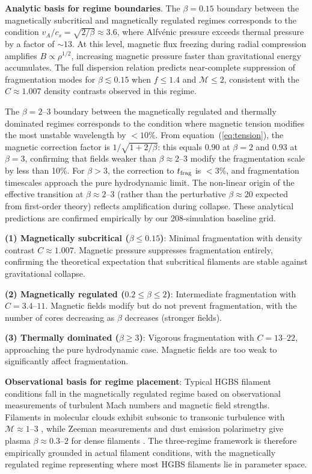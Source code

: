 \documentclass[twoside,twocolumn]{mnras}
\begin{document}
\textbf{Analytic basis for regime boundaries}. The $\beta = 0.15$ boundary between the magnetically subcritical and magnetically regulated regimes corresponds to the condition $v_A/c_s = \sqrt{2/\beta} \approx 3.6$, where Alfv\'enic pressure exceeds thermal pressure by a factor of $\sim 13$. At this level, magnetic flux freezing during radial compression amplifies $B \propto \rho^{1/2}$, increasing magnetic pressure faster than gravitational energy accumulates. The full dispersion relation \citep{Nakamura1993} predicts near-complete suppression of fragmentation modes for $\beta \lesssim 0.15$ when $f \leq 1.4$ and $\mathcal{M} \leq 2$, consistent with the $C \approx 1.007$ density contrasts observed in this regime.

The $\beta = 2$--$3$ boundary between the magnetically regulated and thermally dominated regimes corresponds to the condition where magnetic tension modifies the most unstable wavelength by $<10\%$. From equation~(\ref{eq:tension}), the magnetic correction factor is $1/\sqrt{1 + 2/\beta}$: this equals $0.90$ at $\beta = 2$ and $0.93$ at $\beta = 3$, confirming that fields weaker than $\beta \approx 2$--$3$ modify the fragmentation scale by less than 10\%. For $\beta > 3$, the correction to $t_{\rm frag}$ is $<3\%$, and fragmentation timescales approach the pure hydrodynamic limit. The non-linear origin of the effective transition at $\beta \approx 2$--$3$ (rather than the perturbative $\beta \approx 20$ expected from first-order theory) reflects amplification during collapse. These analytical predictions are confirmed empirically by our 208-simulation baseline grid.

\textbf{(1) Magnetically subcritical ($\beta \leq 0.15$)}: Minimal fragmentation with density contrast $C \approx 1.007$. Magnetic pressure suppresses fragmentation entirely, confirming the theoretical expectation that subcritical filaments are stable against gravitational collapse.

\textbf{(2) Magnetically regulated ($0.2 \leq \beta \leq 2$)}: Intermediate fragmentation with $C = 3.4$--$11$. Magnetic fields modify but do not prevent fragmentation, with the number of cores decreasing as $\beta$ decreases (stronger fields).

\textbf{(3) Thermally dominated ($\beta \geq 3$)}: Vigorous fragmentation with $C = 13$--$22$, approaching the pure hydrodynamic case. Magnetic fields are too weak to significantly affect fragmentation.

\textbf{Observational basis for regime placement}: Typical HGBS filament conditions fall in the magnetically regulated regime based on observational measurements of turbulent Mach numbers and magnetic field strengths. Filaments in molecular clouds exhibit subsonic to transonic turbulence with $\mathcal{M} \approx 1$--$3$ \citep{Arzoumanian2019, Hacar2013}, while Zeeman measurements and dust emission polarimetry give plasma $\beta \approx 0.3$--$2$ for dense filaments \citep{Planck2016, Pattle2018}. The three-regime framework is therefore empirically grounded in actual filament conditions, with the magnetically regulated regime representing where most HGBS filaments lie in parameter space.
\end{document}
